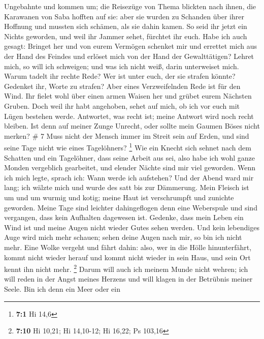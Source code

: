 Ungebahnte und kommen um;  die Reisezüge von Thema
blickten nach ihnen, die Karawanen von Saba hofften auf sie:
 aber sie wurden zu Schanden über ihrer Hoffnung und
mussten sich schämen, als sie dahin kamen.  So seid ihr
jetzt ein Nichts geworden, und weil ihr Jammer sehet, fürchtet ihr euch.
 Habe ich auch gesagt: Bringet her und von eurem Vermögen
schenket mir  und errettet mich aus der Hand des Feindes
und erlöset mich von der Hand der Gewalttätigen?  Lehret
mich, so will ich schweigen; und was ich nicht weiß, darin unterweiset
mich.  Warum tadelt ihr rechte Rede? Wer ist unter euch,
der sie strafen könnte?  Gedenket ihr, Worte zu strafen?
Aber eines Verzweifelnden Rede ist für den Wind.  Ihr
fielet wohl über einen armen Waisen her und grübet eurem Nächsten
Gruben.  Doch weil ihr habt angehoben, sehet auf mich, ob
ich vor euch mit Lügen bestehen werde.  Antwortet, was
recht ist; meine Antwort wird noch recht bleiben.  Ist
denn auf meiner Zunge Unrecht, oder sollte mein Gaumen Böses nicht
merken? \# 7  Muss nicht der Mensch immer im Streit sein
auf Erden, und sind seine Tage nicht wie eines Tagelöhners? \footnote{\textbf{7:1}
  Hi 14,6}  Wie ein Knecht sich sehnet nach dem Schatten
und ein Tagelöhner, dass seine Arbeit aus sei,  also habe
ich wohl ganze Monden vergeblich gearbeitet, und elender Nächte sind mir
viel geworden.  Wenn ich mich legte, sprach ich: Wann
werde ich aufstehen? Und der Abend ward mir lang; ich wälzte mich und
wurde des satt bis zur Dämmerung.  Mein Fleisch ist um und
um wurmig und kotig; meine Haut ist verschrumpft und zunichte geworden.
 Meine Tage sind leichter dahingeflogen denn eine
Weberspule und sind vergangen, dass kein Aufhalten dagewesen ist.
 Gedenke, dass mein Leben ein Wind ist und meine Augen
nicht wieder Gutes sehen werden.  Und kein lebendiges Auge
wird mich mehr schauen; sehen deine Augen nach mir, so bin ich nicht
mehr.  Eine Wolke vergeht und fährt dahin: also, wer in
die Hölle hinunterfährt, kommt nicht wieder herauf  und
kommt nicht wieder in sein Haus, und sein Ort kennt ihn nicht mehr.
\footnote{\textbf{7:10} Hi 10,21; Hi 14,10-12; Hi 16,22; Ps 103,16}
 Darum will auch ich meinem Munde nicht wehren; ich will
reden in der Angst meines Herzens und will klagen in der Betrübnis
meiner Seele.  Bin ich denn ein Meer oder ein
